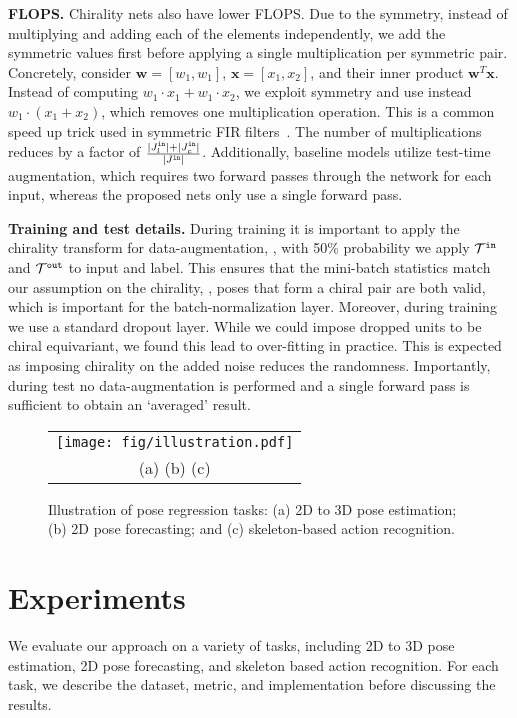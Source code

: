 \documentclass{article}
\begin{document}
\textbf{FLOPS.} Chirality nets  also have lower FLOPS.  Due to the symmetry, instead of multiplying and adding each of the elements independently, we  add the symmetric values first before applying a single multiplication per symmetric pair. 
{
Concretely, consider $\mathbf{w} = [w_1, w_1]$, $\mathbf{x} = [x_1, x_2]$, and their inner product $\mathbf{w}^{T}\mathbf{x}$. Instead of  computing $w_1\cdot x_1 + w_1\cdot x_2$, we exploit symmetry and use instead  $w_1 \cdot (x_1 + x_2)$, which removes one multiplication operation. 
}
This is a common speed up trick used in symmetric FIR filters~\cite{note1998implementing, yeh2016stable}. The number of multiplications reduces by a factor of $\frac{|J_{l}^{\tt in}| + |J_{c}^{\tt in}|}{|J^{\tt in}|}$. Additionally, baseline models utilize test-time augmentation, which requires two forward passes through the network for each input, whereas the proposed nets only use a single forward pass. 

\textbf{Training and test details.}  
During training it is important to apply the chirality transform for data-augmentation, \ie, with 50\% probability we apply $\mathcal{T}^{\tt in}$ and $\mathcal{T}^{\tt out}$ to  input and label. This  ensures that the mini-batch statistics match our assumption on the chirality, \ie, poses that form a chiral pair are both valid, which is important for the batch-normalization layer. 
Moreover, during training we use a standard dropout layer. While we could impose  dropped units to be chiral equivariant, we found this lead to over-fitting in practice. This is expected as imposing chirality on the added noise reduces the randomness. 
Importantly, during test no data-augmentation is performed and a single forward pass is sufficient to obtain an `averaged' result. 

 \begin{figure}
\centering
\begin{tabular}{c}
\texttt{[image: fig/illustration.pdf]}\vspace{-0.3cm}\\
(a) \hspace{1.5in} (b) \hspace{1.5in} (c)\\
\end{tabular}
\vspace{-0.3cm}
\caption{
Illustration of  pose regression tasks: (a) 2D to 3D pose estimation;
(b) 2D pose forecasting; and (c)  skeleton-based action recognition.} 
\label{fig:task_ill}
\vspace{-0.4cm}
\end{figure} \section{Experiments}
\label{sec:exp}
{
We evaluate our approach on a variety of tasks, including 2D to 3D pose estimation, 2D pose forecasting, and skeleton based action recognition. For each task, we describe the dataset, metric, and implementation before discussing the results.
}
\end{document}
